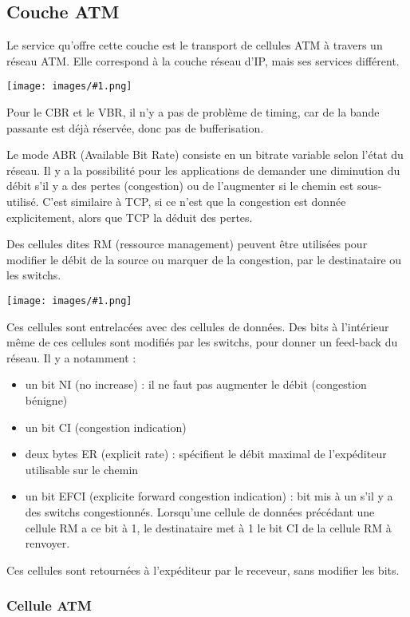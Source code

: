 \documentclass[10pt,a4paper]{report}
\newcommand{\dessin}[1]{\begin{center}\texttt{[image: images/\#1.png]}\end{center}}
\newcommand{\dessinS}[2]{\begin{center}\texttt{[image: images/\#1.png]}\end{center}}
\begin{document}
	
	\subsection{Couche ATM}
	
	Le service qu'offre cette couche est le transport de cellules ATM à travers un réseau ATM. Elle correspond à la couche réseau d'IP, mais ses services différent.
	
	\dessinS{9}{.6}
	
	Pour le CBR et le VBR, il n'y a pas de problème de timing, car de la bande passante est déjà réservée, donc pas de bufferisation.
	
	Le mode ABR (Available Bit Rate) consiste en un bitrate variable selon l'état du réseau. Il y a la possibilité pour les applications de demander une diminution du débit s'il y a des pertes (congestion) ou de l'augmenter si le chemin est sous-utilisé. C'est similaire à TCP, si ce n'est que la congestion est donnée explicitement, alors que TCP la déduit des pertes.
	
		
	Des cellules dites RM (ressource management) peuvent être utilisées pour modifier le débit de la source ou marquer de la congestion, par le destinataire ou les switchs.
	
	\dessin{10}
	
	Ces cellules sont entrelacées avec des cellules de données. Des bits à l'intérieur même de ces cellules sont modifiés par les switchs, pour donner un feed-back du réseau. Il y a notamment  :
	
	\begin{itemize}
		\item un bit NI (no increase) : il ne faut pas augmenter le débit (congestion bénigne)
		\item un bit CI (congestion indication)
		\item deux bytes ER (explicit rate) : spécifient le débit maximal de l'expéditeur utilisable sur le chemin
		\item un bit EFCI (explicite forward congestion indication) : bit mis à un s'il y a des switchs congestionnés. Lorsqu'une cellule de données précédant une cellule RM a ce bit à 1, le destinataire met à 1 le bit CI de la cellule RM à renvoyer.
	\end{itemize}
	
	Ces cellules sont retournées à l'expéditeur par le receveur, sans modifier les bits.
	
	
		\subsubsection{Cellule ATM}
		
\end{document}
